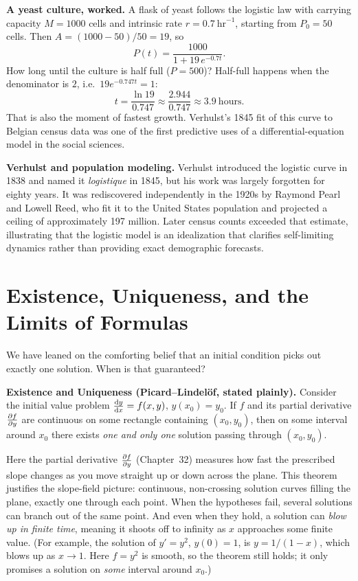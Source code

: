 \begin{applicationbox}
\textbf{A yeast culture, worked.} A flask of yeast follows the logistic law with
carrying capacity $M=1000$ cells and intrinsic rate $r=0.7\ \text{hr}^{-1}$,
starting from $P_0=50$ cells. Then $A=(1000-50)/50 = 19$, so
\[
  P(t) = \frac{1000}{1 + 19\,e^{-0.7t}}.
\]
How long until the culture is half full ($P=500$)? Half-full happens when the
denominator is $2$, i.e.\ $19e^{-0.747t}=1$:
\[
  t = \frac{\ln 19}{0.747} \approx \frac{2.944}{0.747}\approx 3.9\ \text{hours}.
\]
That is also the moment of fastest growth. Verhulst's 1845 fit of this curve to
Belgian census data was one of the first predictive uses of a
differential-equation model in the social sciences.
\end{applicationbox}

\begin{aestheticbox}
\textbf{Verhulst and population modeling.} Verhulst introduced the logistic curve
in 1838 and named it \emph{logistique} in 1845, but his work was largely forgotten
for eighty years. It was rediscovered independently in the 1920s by Raymond Pearl
and Lowell Reed, who fit it to the United States population and projected a ceiling
of approximately 197 million. Later census counts exceeded that estimate,
illustrating that the logistic model is an idealization that clarifies self-limiting
dynamics rather than providing exact demographic forecasts.
\end{aestheticbox}

\section{Existence, Uniqueness, and the Limits of Formulas}

We have leaned on the comforting belief that an initial condition picks out exactly
one solution. When is that guaranteed?

\begin{formalbox}
\textbf{Existence and Uniqueness (Picard--Lindel\"of, stated plainly).} Consider the
initial value problem $\frac{\mathrm{d} y}{\mathrm{d} x}=f(x,y)$, $y(x_0)=y_0$. If $f$ and its partial
derivative $\frac{\partial f}{\partial y}$ are continuous on some rectangle containing $(x_0,y_0)$, then
on some interval around $x_0$ there exists \emph{one and only one} solution passing
through $(x_0,y_0)$.
\end{formalbox}

Here the partial derivative $\frac{\partial f}{\partial y}$ (Chapter~32) measures how fast the prescribed
slope changes as you move straight up or down across the plane. This theorem
justifies the slope-field picture: continuous, non-crossing
solution curves filling the plane, exactly one through each point. When the
hypotheses fail, several solutions can branch out of the
same point. And even when they hold, a solution can \emph{blow up in finite time}, meaning it shoots off
to infinity as $x$ approaches some finite value. (For example, the solution of
$y'=y^2$, $y(0)=1$, is $y=1/(1-x)$, which blows up as $x\to 1$. Here $f=y^2$ is
smooth, so the theorem still holds; it only promises a solution on \emph{some}
interval around $x_0$.)

